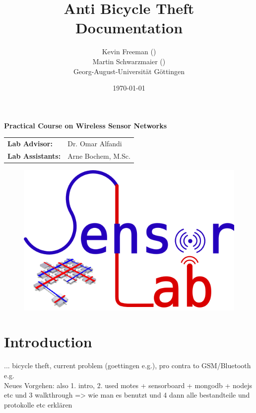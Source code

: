 \documentclass[a4paper]{article}
\title{\textbf{Anti Bicycle Theft}\bigskip\\Documentation}
\author{Kevin Freeman (\matone)\\ Martin Schwarzmaier (\mattwo)\\Georg-August-Universität Göttingen}
\date{\today}
\begin{document}
\setlength\parindent{0pt}
\maketitle
\begin{center}
	\textbf{Practical Course on Wireless Sensor Networks}
\end{center}\vspace{10em}
\begin{center}
	\begin{tabular}{ll}
	\textbf{Lab Advisor: }&Dr. Omar Alfandi\\
	\textbf{Lab Assistants: }&Arne Bochem, M.Sc.
	\end{tabular}
\end{center}

\begin{figure}[b]
	\centering
	\includegraphics[scale=1]{logo.png} %
\end{figure}

\thispagestyle{empty} %
\newpage

\tableofcontents
\thispagestyle{empty} %
\newpage

\setcounter{page}{1} %

\section{Introduction}
... bicycle theft, current problem (goettingen e.g.), pro contra to GSM/Bluetooth e.g.\\
Neues Vorgehen:
also 1. intro, 2. used motes + sensorboard + mongodb + nodejs etc und 3 walkthrough => wie man es benutzt und 4 dann alle bestandteile und protokolle etc erklären
\end{document}
